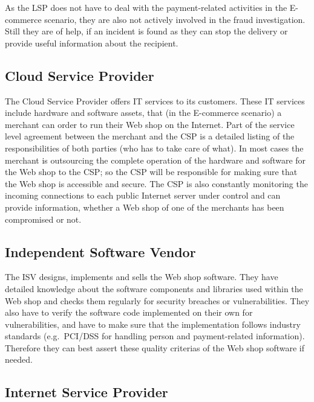 As the \gls{LSP} does not have to deal with the payment-related activities in the \gls{E-commerce} scenario, they are also not actively involved in the fraud investigation. Still they are of help, if an incident is found as they can stop the delivery or provide useful information about the recipient.


\subsection{Cloud Service Provider}
\label{subsec:stakeholder_csp}

The Cloud Service Provider offers \gls{IT} services to its customers. These \gls{IT} services include hardware and software assets, that (in the \gls{E-commerce} scenario) a merchant can order to run their Web shop on the Internet. Part of the service level agreement between the merchant and the \gls{CSP} is a detailed listing of the responsibilities of both parties (who has to take care of what). In most cases the merchant is outsourcing the complete operation of the hardware and software for the Web shop to the \gls{CSP}; so the \gls{CSP} will be responsible for making sure that the Web shop is accessible and secure. The \gls{CSP} is also constantly monitoring the incoming connections to each public Internet server under control and can provide information, whether a Web shop of one of the merchants has been compromised or not.


\subsection{Independent Software Vendor}
\label{subsec:stakeholder_isv}

The \gls{ISV} designs, implements and sells the Web shop software. They have detailed knowledge about the software components and libraries used within the Web shop and checks them regularly for security breaches or vulnerabilities. They also have to verify the software code implemented on their own for vulnerabilities, and have to make sure that the implementation follows industry standards (e.g.\ \gls{PCI/DSS} for handling person and payment-related information). Therefore they can best assert these quality criterias of the Web shop software if needed.


\subsection{Internet Service Provider}
\label{subsec:stakeholder_isp}

